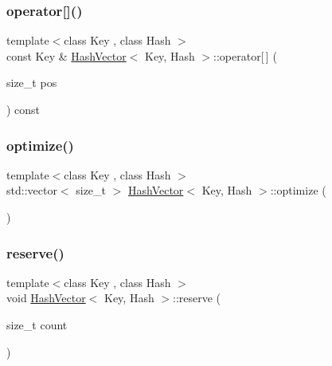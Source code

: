\mbox{\label{class_hash_vector_a6ec9410b623647597aee298b8798b644}} 
\subsubsection{\texorpdfstring{operator[]()}{operator[]()}}
{\footnotesize\ttfamily template$<$class Key , class Hash $>$ \\
const Key \& \mbox{\hyperlink{class_hash_vector}{Hash\+Vector}}$<$ Key, Hash $>$\+::operator\mbox{[}$\,$\mbox{]} (\begin{DoxyParamCaption}\item[{size\+\_\+t}]{pos }\end{DoxyParamCaption}) const}

\mbox{\label{class_hash_vector_a8384131d8bd1e720df5f09b11b3b7dda}} 
\subsubsection{\texorpdfstring{optimize()}{optimize()}}
{\footnotesize\ttfamily template$<$class Key , class Hash $>$ \\
std\+::vector$<$ size\+\_\+t $>$ \mbox{\hyperlink{class_hash_vector}{Hash\+Vector}}$<$ Key, Hash $>$\+::optimize (\begin{DoxyParamCaption}{ }\end{DoxyParamCaption})}

\mbox{\label{class_hash_vector_a7e281851a17203dd7dda859aeaa20c6a}} 
\subsubsection{\texorpdfstring{reserve()}{reserve()}}
{\footnotesize\ttfamily template$<$class Key , class Hash $>$ \\
void \mbox{\hyperlink{class_hash_vector}{Hash\+Vector}}$<$ Key, Hash $>$\+::reserve (\begin{DoxyParamCaption}\item[{size\+\_\+t}]{count }\end{DoxyParamCaption})}

